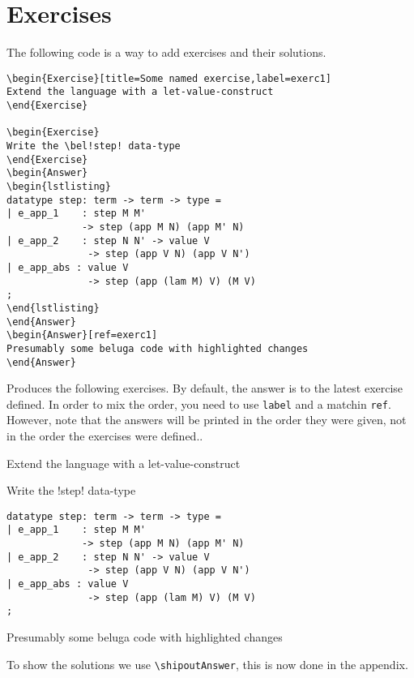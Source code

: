 \documentclass[12pt,draft]{article}
\begin{document}
\section{Exercises}
The following code is a way to add exercises and their solutions.
\begin{verbatim}
\begin{Exercise}[title=Some named exercise,label=exerc1]
Extend the language with a let-value-construct
\end{Exercise}

\begin{Exercise}
Write the \bel!step! data-type
\end{Exercise}
\begin{Answer}
\begin{lstlisting}
datatype step: term -> term -> type =
| e_app_1    : step M M'
             -> step (app M N) (app M' N)
| e_app_2    : step N N' -> value V
              -> step (app V N) (app V N')
| e_app_abs : value V
              -> step (app (lam M) V) (M V)
;
\end{lstlisting}
\end{Answer}
\begin{Answer}[ref=exerc1]
Presumably some beluga code with highlighted changes
\end{Answer}
\end{verbatim}
Produces the following exercises. By default, the answer is to the latest exercise defined. In order to mix the order, you need to use \verb!label! and a matchin \verb!ref!. However, note that the answers will be printed in the order they were given, not in the order the exercises were defined..
\begin{Exercise}[title=Some named exercise,label=exerc1]
Extend the language with a let-value-construct
\end{Exercise}
\begin{Exercise}
Write the \bel!step! data-type
\end{Exercise}
\begin{Answer}
\begin{lstlisting}
datatype step: term -> term -> type =
| e_app_1    : step M M'
             -> step (app M N) (app M' N)
| e_app_2    : step N N' -> value V
              -> step (app V N) (app V N')
| e_app_abs : value V
              -> step (app (lam M) V) (M V)
;
\end{lstlisting}
\end{Answer}
\begin{Answer}[ref=exerc1]
Presumably some beluga code with highlighted changes
\end{Answer}

To show the solutions we use \verb|\shipoutAnswer|, this is now done in the appendix.

\shipoutAnswer
\end{document}
